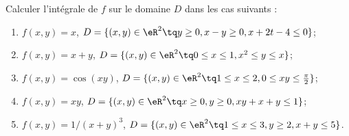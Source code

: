 
\begin{exercice}\label{exoOutilsMath-0102}

    Calculer l'intégrale de $f$ sur le domaine $D$ dans les cas suivants :
    \begin{enumerate}
        \item
            $f(x,y)=x$, $D=\{ (x,y)\in\eR^2\tq y\geq 0,x-y\geq 0,x+2t-4\leq 0 \}$;
        \item
            $f(x,y)=x+y$, $D=\{ (x,y)\in\eR^2\tq 0\leq x\leq 1,x^2\leq y\leq x\}$;
        \item
            $f(x,y)=\cos(xy)$, $D=\{ (x,y)\in\eR^2\tq 1 \leq x\leq 2,0\leq xy\leq \frac{ \pi }{2}\}$;
        \item
            $f(x,y)=xy$, $D=\{ (x,y)\in\eR^2\tq x\geq 0,y\geq 0,xy+x+y\leq 1\}$;
        \item
            $f(x,y)=1/(x+y)^3$, $D=\{ (x,y)\in\eR^2\tq 1\leq x\leq 3,y\geq 2,x+y\leq 5\}$.
    \end{enumerate}

\end{exercice}
